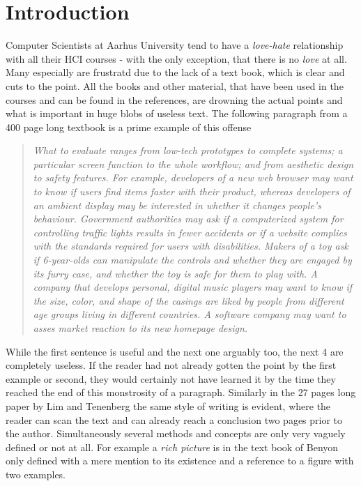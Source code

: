 \chapter{Introduction} \label{chap:introduction}
Computer Scientists at Aarhus University tend to have a \emph{love-hate} relationship with all their HCI courses - with the only exception, that there is no \emph{love} at all. Many especially are frustratd due to the lack of a text book, which is clear and cuts to the point. All the books and other material, that have been used in the courses and can be found in the references, are drowning the actual points and what is important in huge blobs of useless text. The following paragraph from a 400 page long textbook is a prime example of this offense

\blockcquote[p. 435]{rogers}{\it What to evaluate ranges from low-tech prototypes to complete systems; a particular screen function to the whole workflow; and from aesthetic design to safety features. For example, developers of a new web browser may want to know if users find items faster with their product, whereas developers of an ambient display may be interested in whether it changes people's behaviour. Government authorities may ask if a computerized system for controlling traffic lights results in fewer accidents or if a website complies with the standards required for users with disabilities. Makers of a toy ask if 6-year-olds can manipulate the controls and whether they are engaged by its furry case, and whether the toy is safe for them to play with. A company that develops personal, digital music players may want to know if the size, color, and shape of the casings are liked by people from different age groups living in different countries. A software company may want to asses market reaction to its new homepage design.}

\noindent While the first sentence is useful and the next one arguably too, the next 4 are completely useless. If the reader had not already gotten the point by the first example or second, they would certainly not have learned it by the time they reached the end of this monstrosity of a paragraph. Similarly in the 27 pages long paper by Lim and Tenenberg \cite{lim} the same style of writing is evident, where the reader can scan the text and can already reach a conclusion two pages prior to the author. Simultaneously several methods and concepts are only very vaguely defined or not at all. For example a \emph{rich picture} is in the text book of Benyon only defined with a mere mention to its existence and a reference to a figure with two examples. \cite[p. 51-52]{benyon_14}

